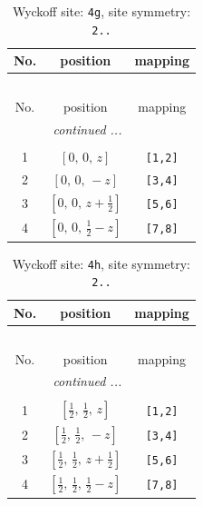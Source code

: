 \documentclass[fleqn,8pt]{jsarticle}
\begin{document}
\renewcommand{\arraystretch}{1.2}
\begin{longtable}{ccc}
\caption{Wyckoff site: {\tt 4g}, site symmetry: {\tt 2..}}
 \\
 \hline \hline
No. & position & mapping \\ \hline \endfirsthead

\multicolumn{2}{l}{\tablename\ \thetable{}} \\
 \hline \hline
No. & position & mapping \\ \hline \endhead

 \hline \hline
\multicolumn{2}{r}{\footnotesize\it continued ...} \\ \endfoot

 \hline \hline
\multicolumn{2}{r}{} \\ \endlastfoot

1 & $\left[ 0,\, 0,\, z \right]$ & {\tt [1,2]} \\ \hline
2 & $\left[ 0,\, 0,\, - z \right]$ & {\tt [3,4]} \\ \hline
3 & $\left[ 0,\, 0,\, z + \frac{1}{2} \right]$ & {\tt [5,6]} \\ \hline
4 & $\left[ 0,\, 0,\, \frac{1}{2} - z \right]$ & {\tt [7,8]} \\
\end{longtable}
\renewcommand{\arraystretch}{1.2}
\begin{longtable}{ccc}
\caption{Wyckoff site: {\tt 4h}, site symmetry: {\tt 2..}}
 \\
 \hline \hline
No. & position & mapping \\ \hline \endfirsthead

\multicolumn{2}{l}{\tablename\ \thetable{}} \\
 \hline \hline
No. & position & mapping \\ \hline \endhead

 \hline \hline
\multicolumn{2}{r}{\footnotesize\it continued ...} \\ \endfoot

 \hline \hline
\multicolumn{2}{r}{} \\ \endlastfoot

1 & $\left[ \frac{1}{2},\, \frac{1}{2},\, z \right]$ & {\tt [1,2]} \\ \hline
2 & $\left[ \frac{1}{2},\, \frac{1}{2},\, - z \right]$ & {\tt [3,4]} \\ \hline
3 & $\left[ \frac{1}{2},\, \frac{1}{2},\, z + \frac{1}{2} \right]$ & {\tt [5,6]} \\ \hline
4 & $\left[ \frac{1}{2},\, \frac{1}{2},\, \frac{1}{2} - z \right]$ & {\tt [7,8]} \\
\end{longtable}
\end{document}
